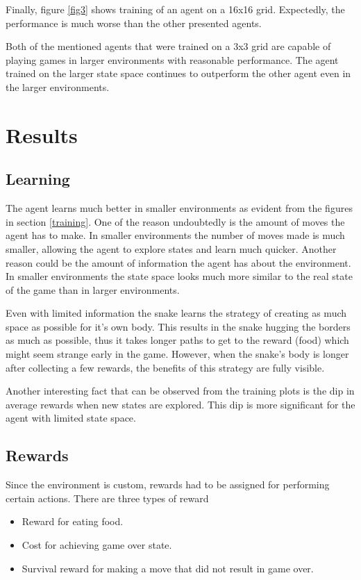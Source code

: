 \documentclass[lettersize,journal]{IEEEtran}
\begin{document}
Finally, figure \ref{fig3} shows training of an agent on a 16x16 grid.
Expectedly, the performance is much worse than the other presented agents.

Both of the mentioned agents that were trained on a 3x3 grid are capable of playing games in larger environments with
reasonable performance. The agent trained on the larger state space continues
to outperform the other agent even in the larger environments.


\section{Results}

\subsection{Learning}
The agent learns much better in smaller environments as evident from
the figures in section \ref{training}. One of the reason
undoubtedly is the amount of moves the agent has to make. In
smaller environments the number of moves made is much smaller,
allowing the agent to explore states and learn much quicker.
Another reason could be the amount of information the agent has
about the environment. In smaller environments the state space
looks much more similar to the real state of the game than in
larger environments.

Even with limited information the snake learns the strategy
of creating as much space as possible for it's own body.
This results in the snake hugging the borders as much
as possible, thus it takes longer paths to get to the reward (food) which
might seem strange early in the game.
However, when the snake's body is longer after collecting a
few rewards, the benefits of this strategy are fully visible.

Another interesting fact that can be observed from the training plots is
the dip in average rewards when new states are explored. This dip
is more significant for the agent with limited state space.


\subsection{Rewards}
Since the environment is custom, rewards had to be assigned for
performing certain actions. There are three types of reward
\begin{itemize}
    \item Reward for eating food.
    \item Cost for achieving game over state.
    \item Survival reward for making a move that did not result
        in game over.
\end{itemize}
\end{document}
